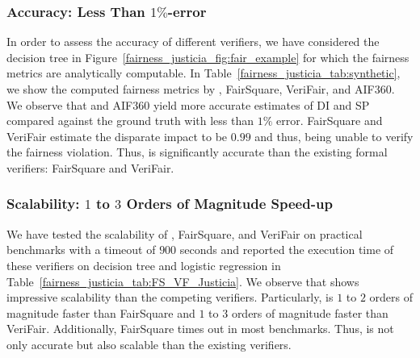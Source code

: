 


\subsubsection{Accuracy: Less Than $  1\%$-error} 
In order to assess the accuracy of different verifiers, we have considered the decision tree in Figure~\ref{fairness_justicia_fig:fair_example} for which the fairness metrics  are analytically computable. 
In Table~\ref{fairness_justicia_tab:synthetic}, we show the computed fairness metrics by {\justicia}, FairSquare, VeriFair, and AIF360. We observe that {\justicia} and AIF360  yield more accurate estimates of DI and SP compared against the ground truth with less than $1\%$ error.
FairSquare and VeriFair  estimate the disparate impact to be $0.99$ and thus, being unable to verify the fairness violation. 
Thus, {\justicia} is significantly accurate than the existing formal verifiers: FairSquare and VeriFair. 





\subsubsection{Scalability: $ 1 $ to $ 3 $ Orders of Magnitude Speed-up} 
We have tested the scalability of {\justicia}, FairSquare, and VeriFair on practical benchmarks with a timeout of $900$ seconds and reported the execution time of these verifiers on decision tree and logistic regression in Table~\ref{fairness_justicia_tab:FS_VF_Justicia}. We observe that {\justicia} shows impressive scalability than the competing verifiers. Particularly, {\justicia} is $ 1 $ to $ 2 $ orders of magnitude faster than FairSquare and  $ 1 $ to $ 3 $ orders of magnitude faster than VeriFair. Additionally, FairSquare times out in most  benchmarks.
Thus, {\justicia} is not only accurate but also scalable than the existing verifiers. 


